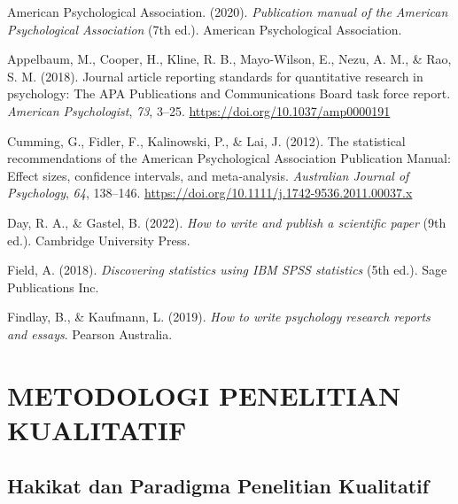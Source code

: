 \documentclass[
  indonesian,
  letterpaper,
  DIV=11,
  numbers=noendperiod]{scrreprt}
\newlength{\cslhangindent}
\newenvironment{CSLReferences}[2] %
 {\begin{list}{}{%
  \setlength{\itemindent}{0pt}
  \setlength{\leftmargin}{0pt}
  \setlength{\parsep}{0pt}
  \ifodd #1
   \setlength{\leftmargin}{\cslhangindent}
   \setlength{\itemindent}{-1\cslhangindent}
  \fi
  \setlength{\itemsep}{#2\baselineskip}}}
 {\end{list}}
\begin{document}
\label{refs--15}
\begin{CSLReferences}{1}{0}
American Psychological Association. (2020). \emph{Publication manual of
the American Psychological Association} (7th ed.). American
Psychological Association.

Appelbaum, M., Cooper, H., Kline, R. B., Mayo-Wilson, E., Nezu, A. M.,
\& Rao, S. M. (2018). Journal article reporting standards for
quantitative research in psychology: The APA Publications and
Communications Board task force report. \emph{American Psychologist},
\emph{73}, 3--25. \url{https://doi.org/10.1037/amp0000191}

Cumming, G., Fidler, F., Kalinowski, P., \& Lai, J. (2012). The
statistical recommendations of the American Psychological Association
Publication Manual: Effect sizes, confidence intervals, and
meta‐analysis. \emph{Australian Journal of Psychology}, \emph{64},
138--146. \url{https://doi.org/10.1111/j.1742-9536.2011.00037.x}

Day, R. A., \& Gastel, B. (2022). \emph{How to write and publish a
scientific paper} (9th ed.). Cambridge University Press.

Field, A. (2018). \emph{Discovering statistics using IBM SPSS
statistics} (5th ed.). Sage Publications Inc.

Findlay, B., \& Kaufmann, L. (2019). \emph{How to write psychology
research reports and essays}. Pearson Australia.

\end{CSLReferences}

\part{METODOLOGI PENELITIAN KUALITATIF}

\chapter{Hakikat dan Paradigma Penelitian
Kualitatif}\label{hakikat-dan-paradigma-penelitian-kualitatif}
\end{document}
